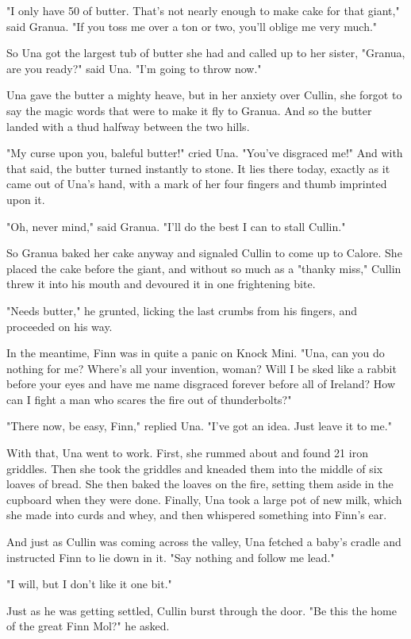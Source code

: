 "I only have 50 of butter. That's not nearly enough to make cake for that giant," said Granua. "If you toss me over a ton or two, you'll oblige me very much."

So Una got the largest tub of butter she had and called up to her sister, "Granua, are you ready?" said Una. "I'm going to throw now."

Una gave the butter a mighty heave, but in her anxiety over Cullin, she forgot to say the magic words that were to make it fly to Granua. And so the butter landed with a thud halfway between the two hills.

"My curse upon you, baleful butter!" cried Una. "You've disgraced me!" And with that said, the butter turned instantly to stone. It lies there today, exactly as it came out of Una's hand, with a mark of her four fingers and thumb imprinted upon it.

"Oh, never mind," said Granua. "I'll do the best I can to stall Cullin."

So Granua baked her cake anyway and signaled Cullin to come up to Calore. She placed the cake before the giant, and without so much as a "thanky miss," Cullin threw it into his mouth and devoured it in one frightening bite.

"Needs butter," he grunted, licking the last crumbs from his fingers, and proceeded on his way.

In the meantime, Finn was in quite a panic on Knock Mini. "Una, can you do nothing for me? Where's all your invention, woman? Will I be sked like a rabbit before your eyes and have me name disgraced forever before all of Ireland? How can I fight a man who scares the fire out of thunderbolts?"

"There now, be easy, Finn," replied Una. "I've got an idea. Just leave it to me."

With that, Una went to work. First, she rummed about and found 21 iron griddles. Then she took the griddles and kneaded them into the middle of six loaves of bread. She then baked the loaves on the fire, setting them aside in the cupboard when they were done. Finally, Una took a large pot of new milk, which she made into curds and whey, and then whispered something into Finn's ear.

And just as Cullin was coming across the valley, Una fetched a baby's cradle and instructed Finn to lie down in it. "Say nothing and follow me lead."

"I will, but I don't like it one bit."

Just as he was getting settled, Cullin burst through the door. "Be this the home of the great Finn Mol?" he asked.

